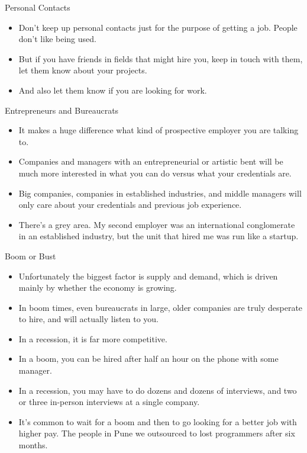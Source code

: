 \documentclass{beamer}
\begin{document}
\begin{frame}{Personal Contacts}
  \begin{itemize}
  \item
    Don't keep up personal contacts just for the purpose of getting a job. People don't like being used.
  \item
    But if you have friends in fields that might hire you, keep in touch with them, let them know about your projects.
  \item
    And also let them know if you are looking for work.
  \end{itemize}
\end{frame}

\begin{frame}{Entrepreneurs and Bureaucrats}
  \begin{itemize}
  \item
    It makes a huge difference what kind of prospective employer you are talking to.
  \item
    Companies and managers with an entrepreneurial or artistic bent will be much more interested in what you can do versus what your credentials are.
  \item
    Big companies, companies in established industries, and middle managers will only care about your credentials and previous job experience.
  \item
    There's a grey area. My second employer was an international conglomerate in an established industry, but the unit that hired me was run like a startup.
  \end{itemize}
\end{frame}

\begin{frame}{Boom or Bust}
  \begin{itemize}
  \item
    Unfortunately the biggest factor is supply and demand, which is driven mainly by whether the economy is growing.
  \item
    In boom times, even bureaucrats in large, older companies are truly desperate to hire, and will actually listen to you.
  \item
    In a recession, it is far more competitive.
  \item 
    In a boom, you can be hired after half an hour on the phone with some manager.
  \item
    In a recession, you may have to do dozens and dozens of interviews, and two or three in-person interviews at a single company.
  \item
    It's common to wait for a boom and then to go looking for a better job with higher pay. The people in Pune we outsourced to lost programmers after six months.
  \end{itemize}
\end{frame}
\end{document}
